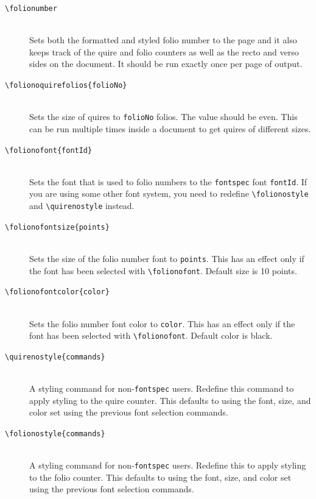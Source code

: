 \documentclass[a4paper, 12pt]{article}
\newcommand{\feature}[1]{\texttt{#1}}
\newcommand{\command}[1]{\texttt{\textbackslash{}#1}}
\newcommand{\commandone}[2]{\texttt{\textbackslash{}#1\{#2\}}}
\newcommand{\argument}[1]{\texttt{#1}}
\begin{document}
\begin{description}
\item [\command{folionumber}] \mbox{} \\
  Sets both the formatted and styled folio number to the page and it
  also keeps track of the quire and folio counters as well as the
  recto and verso sides on the document. It should be run exactly once
  per page of output.

\item [\commandone{folionoquirefolios}{folioNo}] \mbox{} \\
  Sets the size of quires to \argument{folioNo} folios.
  The value should be even. This can be run multiple times inside a
  document to get quires of different sizes.

\item [\commandone{folionofont}{fontId}] \mbox{} \\
  Sets the font that is used to folio numbers to the
  \feature{fontspec} font \argument{fontId}. If you are using some
  other font system, you need to redefine \command{folionostyle} and
  \command{quirenostyle} instead.
  
\item [\commandone{folionofontsize}{points}] \mbox{} \\
  Sets the size of the folio number font to \argument{points}. This
  has an effect only if the font has been selected with
  \command{folionofont}. Default size is 10 points. 

\item [\commandone{folionofontcolor}{color}] \mbox{} \\
  Sets the folio number font color to \argument{color}. This has an
  effect only if the font has been selected with
  \command{folionofont}. Default color is black. 

\item [\commandone{quirenostyle}{commands}] \mbox{} \\
  A styling command for non-\feature{fontspec} users. Redefine this
  command to apply styling to the quire counter. This defaults to
  using the font, size, and color set using the previous font
  selection commands.

\item [\commandone{folionostyle}{commands}] \mbox{} \\
  A styling command for non-\feature{fontspec} users. Redefine this to
  apply styling to the folio counter. This defaults to using the font,
  size, and color set using the previous font selection commands.


\end{description}
\end{document}
